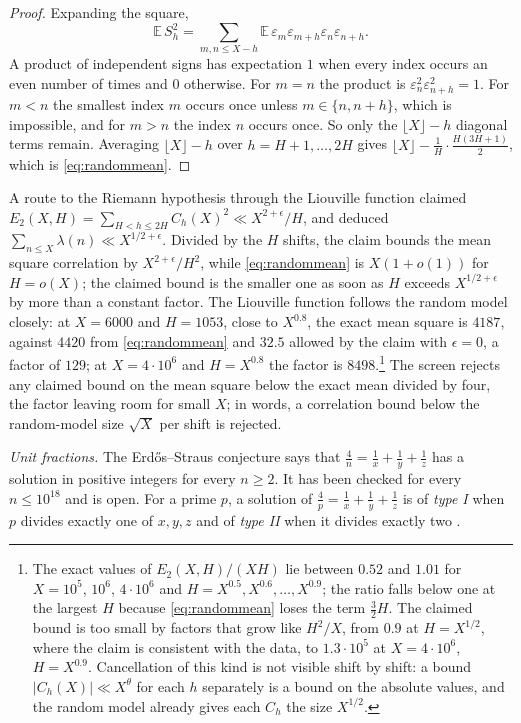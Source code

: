 \begin{proof}
Expanding the square,
\[
\mathbb{E}\,S_{h}^{2}=\sum_{m,n\le X-h}\mathbb{E}\,\varepsilon_{m}\varepsilon_{m+h}\varepsilon_{n}\varepsilon_{n+h}.
\]
A product of independent signs has expectation $1$ when every index occurs an even number of times and $0$ otherwise. For $m=n$ the product is $\varepsilon_{n}^{2}\varepsilon_{n+h}^{2}=1$. For $m<n$ the smallest index $m$ occurs once unless $m\in\{n,n+h\}$, which is impossible, and for $m>n$ the index $n$ occurs once. So only the $\lfloor X\rfloor-h$ diagonal terms remain. Averaging $\lfloor X\rfloor-h$ over $h=H+1,\dots,2H$ gives $\lfloor X\rfloor-\frac1H\cdot\frac{H(3H+1)}{2}$, which is \eqref{eq:randommean}.
\end{proof}

A route to the Riemann hypothesis through the Liouville function claimed $E_{2}(X,H)=\sum_{H<h\le2H}C_{h}(X)^{2}\ll X^{2+\epsilon}/H$, and deduced $\sum_{n\le X}\lambda(n)\ll X^{1/2+\epsilon}$. Divided by the $H$ shifts, the claim bounds the mean square correlation by $X^{2+\epsilon}/H^{2}$, while \eqref{eq:randommean} is $X(1+o(1))$ for $H=o(X)$; the claimed bound is the smaller one as soon as $H$ exceeds $X^{1/2+\epsilon}$ by more than a constant factor. The Liouville function follows the random model closely: at $X=6000$ and $H=1053$, close to $X^{0.8}$, the exact mean square is $4187$, against $4420$ from \eqref{eq:randommean} and $32.5$ allowed by the claim with $\epsilon=0$, a factor of $129$; at $X=4\cdot10^{6}$ and $H=X^{0.8}$ the factor is $8498$.\footnote{The exact values of $E_{2}(X,H)/(XH)$ lie between $0.52$ and $1.01$ for $X=10^{5}$, $10^{6}$, $4\cdot10^{6}$ and $H=X^{0.5},X^{0.6},\dots,X^{0.9}$; the ratio falls below one at the largest $H$ because \eqref{eq:randommean} loses the term $\frac32H$. The claimed bound is too small by factors that grow like $H^{2}/X$, from $0.9$ at $H=X^{1/2}$, where the claim is consistent with the data, to $1.3\cdot10^{5}$ at $X=4\cdot10^{6}$, $H=X^{0.9}$. Cancellation of this kind is not visible shift by shift: a bound $|C_{h}(X)|\ll X^{\theta}$ for each $h$ separately is a bound on the absolute values, and the random model already gives each $C_{h}$ the size $X^{1/2}$.} The screen rejects any claimed bound on the mean square below the exact mean divided by four, the factor leaving room for small $X$; in words, a correlation bound below the random-model size $\sqrt X$ per shift is rejected.

\emph{Unit fractions.} The Erd\H{o}s--Straus conjecture says that $\frac4n=\frac1x+\frac1y+\frac1z$ has a solution in positive integers for every $n\ge2$. It has been checked for every $n\le10^{18}$ \cite{MB25} and is open. For a prime $p$, a solution of $\frac4p=\frac1x+\frac1y+\frac1z$ is of \emph{type I} when $p$ divides exactly one of $x,y,z$ and of \emph{type II} when it divides exactly two \cite{ET13}.

